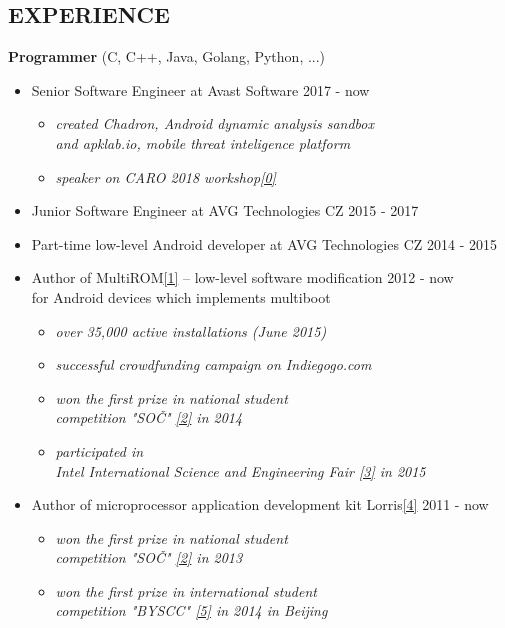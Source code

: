 \documentclass[margin]{res}
\begin{document}
\begin{resume}
\section{EXPERIENCE}
 {\bf Programmer} (C, C++, Java, Golang, Python, ...)
 \begin{itemize} \itemsep -2pt
    \item Senior Software Engineer at Avast Software \hfill{2017 - now}
    \begin{itemize}
        \item \textit{created Chadron, Android dynamic analysis sandbox\\and apklab.io, mobile threat inteligence platform}
        \item \textit{speaker on CARO 2018 workshop\hyperref[caro]{[0]}}
    \end{itemize}
    \item Junior Software Engineer at AVG Technologies CZ \hfill{2015 - 2017}
    \item Part-time low-level Android developer at AVG Technologies CZ \hfill{2014 - 2015}
    \item Author of MultiROM\hyperref[multirom]{[1]} -- low-level software modification \hfill{2012 - now} \\ for Android devices which implements multiboot
        \begin{itemize}
            \item \textit{over 35,000 active installations (June 2015)}
            \item \textit{successful crowdfunding campaign on Indiegogo.com}
            \item \textit{won the first prize in national student \\ competition "SOČ" \hyperref[soc]{[2]} in 2014}
            \item \textit{participated in\\Intel International Science and Engineering Fair \hyperref[isef]{[3]} in 2015}
        \end{itemize}
    \item Author of microprocessor application development kit Lorris\hyperref[lorris]{[4]} \hfill{2011 - now}
        \begin{itemize}
            \item \textit{won the first prize in national student \\ competition "SOČ" \hyperref[soc]{[2]} in 2013}
            \item \textit{won the first prize in international student \\ competition "BYSCC" \hyperref[byscc]{[5]} in 2014 in Beijing}

\end{itemize}
\end{itemize}
\end{resume}
\end{document}
